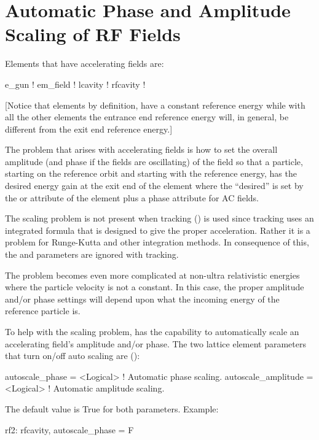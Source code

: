 \section{Automatic Phase and Amplitude Scaling of RF Fields}
\label{s:autoscale}

Elements that have accelerating fields are:
\begin{example}
  e_gun       ! 
  em_field    ! 
  lcavity     ! 
  rfcavity    ! 
\end{example}
[Notice that  elements by definition, have a constant reference energy while with all
the other elements the entrance end reference energy will, in general, be different from the exit
end reference energy.]

The problem that arises with accelerating fields is how to set the overall amplitude (and phase if
the fields are oscillating) of the field so that a particle, starting on the reference orbit and
starting with the reference energy, has the desired energy gain at the exit end of the element where
the ``desired'' is set by the  or  attribute of the element plus a
 phase attribute for AC fields.

The scaling problem is not present when  tracking () is used since
 tracking uses an integrated formula that is designed to give the proper
acceleration. Rather it is a problem for Runge-Kutta and other integration methods. 
In consequence of this, the  and  parameters are ignored
with  tracking.

The problem becomes even more complicated at non-ultra relativistic energies where the particle
velocity is not a constant. In this case, the proper amplitude and/or phase settings will depend
upon what the incoming energy of the reference particle is.

To help with the scaling problem, \bmad has the capability to automatically scale an accelerating
field's amplitude and/or phase. The two lattice element parameters that turn on/off auto scaling are
():
\begin{example}
  autoscale_phase      = <Logical>  ! Automatic phase scaling.
  autoscale_amplitude  = <Logical>  ! Automatic amplitude scaling.
\end{example}
The default value is True for both parameters. Example:
\begin{example}
  rf2: rfcavity, autoscale_phase = F
\end{example}

